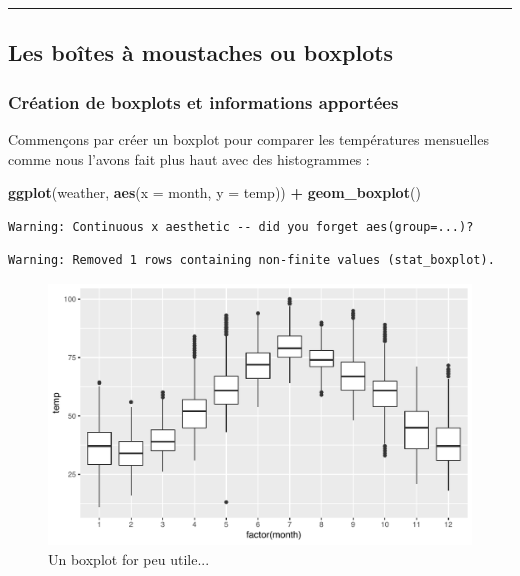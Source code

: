 \documentclass[a4paperpaper,]{article}
\newenvironment{Shaded}{\begin{snugshade}}{\end{snugshade}}
\newcommand{\KeywordTok}[1]{\textcolor[rgb]{0.13,0.29,0.53}{\textbf{#1}}}
\newcommand{\DataTypeTok}[1]{\textcolor[rgb]{0.13,0.29,0.53}{#1}}
\newcommand{\StringTok}[1]{\textcolor[rgb]{0.31,0.60,0.02}{#1}}
\newcommand{\OperatorTok}[1]{\textcolor[rgb]{0.81,0.36,0.00}{\textbf{#1}}}
\newcommand{\NormalTok}[1]{#1}
\theoremstyle{definition}
\theoremstyle{definition}
\theoremstyle{definition}
\theoremstyle{remark}
\begin{document}
\begin{center}\rule{0.5\linewidth}{\linethickness}\end{center}

\subsection{Les boîtes à moustaches ou
boxplots}\label{les-boites-a-moustaches-ou-boxplots}

\subsubsection{Création de boxplots et informations
apportées}\label{creation-de-boxplots-et-informations-apportees}

Commençons par créer un boxplot pour comparer les températures
mensuelles comme nous l'avons fait plus haut avec des histogrammes :

\begin{Shaded}
\begin{Highlighting}[]
\KeywordTok{ggplot}\NormalTok{(weather, }\KeywordTok{aes}\NormalTok{(}\DataTypeTok{x =}\NormalTok{ month, }\DataTypeTok{y =}\NormalTok{ temp)) }\OperatorTok{+}
\StringTok{  }\KeywordTok{geom_boxplot}\NormalTok{()}
\end{Highlighting}
\end{Shaded}

\begin{verbatim}
Warning: Continuous x aesthetic -- did you forget aes(group=...)?
\end{verbatim}

\begin{verbatim}
Warning: Removed 1 rows containing non-finite values (stat_boxplot).
\end{verbatim}

\begin{figure}[htpb]

{\centering \includegraphics[width=0.9\linewidth]{figure/unnamed-chunk-55-1} 

}

\caption{Un boxplot for peu utile...}\label{fig:unnamed-chunk-55}
\end{figure}
\end{document}
